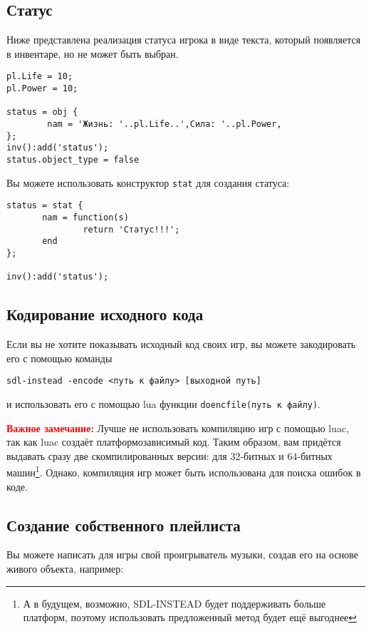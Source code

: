 \documentclass[a4paper,12pt]{article}
\begin{document}
\subsection{Статус}
Ниже представлена реализация статуса игрока в виде текста, который появляется в инвентаре, но не может быть выбран.

\begin{verbatim}
pl.Life = 10;
pl.Power = 10;

status = obj {
        nam = 'Жизнь: '..pl.Life..',Сила: '..pl.Power,
};
inv():add('status');
status.object_type = false
\end{verbatim}

Вы можете использовать конструктор \verb/stat/ для создания статуса:

\begin{verbatim}
status = stat {
       nam = function(s)
               return 'Статус!!!';
       end
};

inv():add('status');
\end{verbatim}
      
\subsection{Кодирование исходного кода}

Если вы не хотите показывать исходный код своих игр, вы можете закодировать его с помощью команды

\begin{verbatim}
sdl-instead -encode <путь к файлу> [выходной путь]
\end{verbatim}

и использовать его с помощью lua функции \verb/doencfile(путь к файлу)/.

\textbf{\textcolor{red}{Важное замечание:}} Лучше не использовать компиляцию игр с помощью luac, так как luac создаёт платформозависимый код. Таким образом, вам придётся выдавать сразу две скомпилированных версии: для 32-битных и 64-битных машин\footnote{А в будущем, возможно, SDL-INSTEAD будет поддерживать больше платформ, поэтому использовать предложенный метод будет ещё выгоднее}. Однако, компиляция игр может быть использована для поиска ошибок в коде.

\subsection{Создание собственного плейлиста}
Вы можете написать для игры свой проигрыватель музыки, создав его на основе живого объекта, например:
\end{document}
